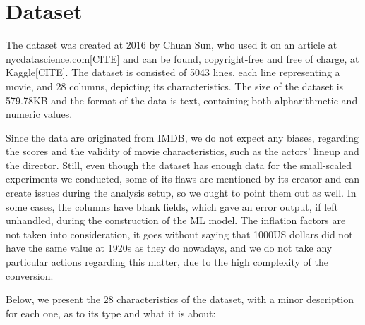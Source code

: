 \documentclass[letterpaper,twocolumn,10pt]{article}
\begin{document}
\section{Dataset}
\par The dataset was created at 2016 by Chuan Sun, who used it on an article at nycdatascience.com[CITE] and can be found, copyright-free and free of charge, at Kaggle[CITE]. The dataset is consisted of 5043 lines, each line representing a movie, and 28 columns, depicting its characteristics. The size of the dataset is 579.78KB and the format of the data is text, containing both alpharithmetic and numeric values.\par Since the data are originated from IMDB, we do not expect any biases, regarding the scores and the validity of movie characteristics, such as the actors' lineup and the director. Still, even though the dataset has enough data for the small-scaled experiments we conducted, some of its flaws are mentioned by its creator and can create issues during the analysis setup, so we ought to point them out as well. In some cases, the columns have blank fields, which gave an error output, if left unhandled, during the construction of the ML model. The inflation factors are not taken into consideration, it goes without saying that 1000US dollars did not have the same value at 1920s as they do nowadays, and we do not take any particular actions regarding this matter, due to the high complexity of the conversion. \par Below, we present the 28 characteristics of the dataset, with a minor description for each one, as to its type and what it is about:
\end{document}
